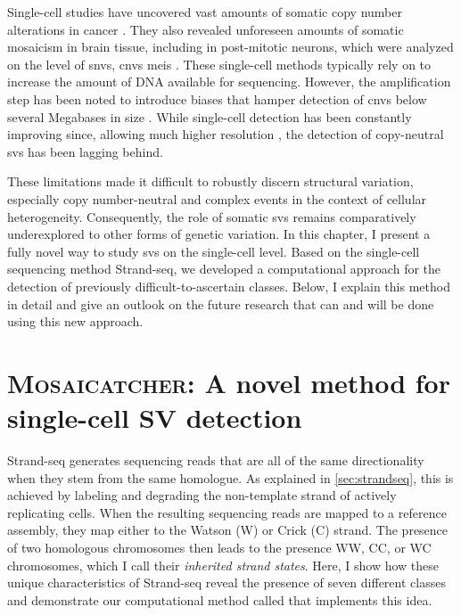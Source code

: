 Single-cell studies have uncovered vast amounts of somatic copy number
alterations in cancer \citep{Navin2011,Demeulemeester2016}. They also revealed
unforeseen amounts of somatic mosaicism in brain tissue, including in
post-mitotic neurons, which were analyzed on the level of \acp{snv}, \acp{cnv}
\acp{mei} \citep{Lodato2015,Cai2014,Evrony2012}.
These single-cell methods typically rely on 
to increase the amount of DNA available for sequencing. However, the amplification step has been noted to
introduce biases that hamper detection of \acp{cnv} below several Megabases in
size \citep{Deleye2017}. While single-cell \cnv detection has been
constantly improving since, allowing much higher resolution
\citep{Garvin2015,Gao2016,Bakker2016,Knouse2016}, the detection of copy-neutral \acp{sv} has
been lagging behind.

These limitations made it difficult to robustly discern structural variation,
especially copy number-neutral and complex events in the context of cellular
heterogeneity. Consequently, the role of somatic \acp{sv} remains comparatively
underexplored to other forms of genetic variation. In this chapter, I present a
fully novel way to study \acp{sv} on the single-cell level. Based on the
single-cell sequencing method Strand-seq, we developed a computational approach
for the detection of previously difficult-to-ascertain \sv classes. Below, I
explain this method in detail and give an outlook on the future research that
can and will be done using this new approach.






\section{\textsc{Mosaicatcher}: A novel method for single-cell SV detection}
\label{sec:mosaic_mc}

Strand-seq generates sequencing reads that are all of the same directionality
when they stem from the same homologue. As explained in \cref{sec:strandseq},
this is achieved by labeling and degrading the non-template strand of
actively replicating cells. When the resulting sequencing reads are mapped to a
reference assembly, they map either to the Watson (W) or Crick (C) strand. The
presence of two homologous chromosomes then leads to the presence WW, CC, or WC
chromosomes, which I call their \emph{inherited strand states}.
Here, I show how these unique characteristics of Strand-seq reveal the presence
of seven different \sv classes and demonstrate our computational method called
\mc that implements this idea.

